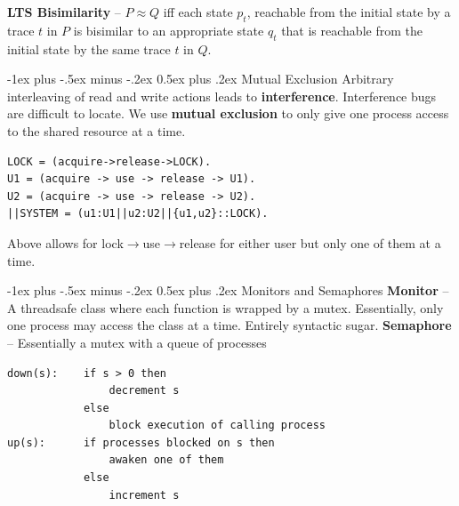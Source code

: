 \documentclass[letterpaper, 8pt]{extarticle}
\makeatletter
\renewcommand{\section}{\@startsection{section}{1}{0mm}%
                                {-1ex plus -.5ex minus -.2ex}%
                                {0.5ex plus .2ex}%
                                {\normalfont\normalsize\bfseries}}
\makeatother
\begin{document}
\begin{multicols*}{5}
  \textbf{LTS Bisimilarity} -- $P \approx Q$ iff each state $p_t$, reachable from the initial state by a trace $t$ in $P$ is bisimilar to an appropriate state $q_t$ that is reachable from the initial state by the same trace $t$ in $Q$.



  \section{Mutual Exclusion}
  Arbitrary interleaving of read and write actions leads to \textbf{interference}.
  Interference bugs are difficult to locate.
  We use \textbf{mutual exclusion} to only give one process access to the shared resource at a time.

  \begin{lstlisting}
LOCK = (acquire->release->LOCK).
U1 = (acquire -> use -> release -> U1).
U2 = (acquire -> use -> release -> U2).
||SYSTEM = (u1:U1||u2:U2||{u1,u2}::LOCK).
\end{lstlisting}
  Above allows for lock$\xrightarrow{}$use$\xrightarrow{}$release for either user but only one of them at a time.

  \section{Monitors and Semaphores}
  \textbf{Monitor} -- A threadsafe class where each function is wrapped by a mutex. Essentially, only one process may access the class at a time. Entirely syntactic sugar.
  \textbf{Semaphore} -- Essentially a mutex with a queue of processes

  \begin{lstlisting}
down(s):    if s > 0 then
                decrement s
            else
                block execution of calling process
up(s):      if processes blocked on s then
                awaken one of them
            else
                increment s
\end{lstlisting}


\end{multicols*}
\end{document}
